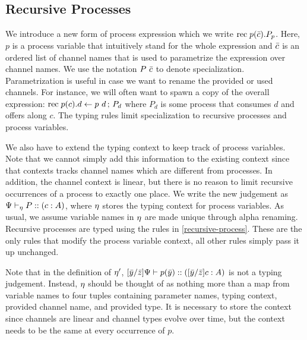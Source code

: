 \subsection{Recursive Processes}

We introduce a new form of process expression which we write $\mathrm{rec}\; {p}(\bar{c}) . {P}_p$. Here, $p$ is a process variable that intuitively stand for the whole expression and $\bar{c}$ is an ordered list of channel names that is used to parametrize the expression over channel names. We use the notation ${P}~{\bar{c}}$ to denote specialization. Parametrization is useful in case we want to rename the provided or used channels. For instance, we will often want to spawn a copy of the overall expression: $\mathrm{rec}\; {p}(c) . {d \leftarrow {p}~{d} \,;\, P_d}$ where $P_d$ is some process that consumes $d$ and offers along $c$. The typing rules limit specialization to recursive processes and process variables.

We also have to extend the typing context to keep track of process variables. Note that we cannot simply add this information to the existing context since that contexts tracks channel names which are different from processes. In addition, the channel context is linear, but there is no reason to limit recursive occurrences of a process to exactly one place. We write the new judgement as ${\Psi} \vdash_{\eta} P :: (c : A)$, where $\eta$ stores the typing context for process variables. As usual, we assume variable names in $\eta$ are made unique through alpha renaming. Recursive processes are typed using the rules in \cref{recursive-process}. These are the only rules that modify the process variable context, all other rules simply pass it up unchanged.


Note that in the definition of $\eta'$, $\lbrack{\bar{y}}/{\bar{z}}\rbrack{\Psi} \vdash {p}(\bar{y}) :: (\lbrack{\bar{y}}/{\bar{z}}\rbrack{c} : A)$ is not a typing judgement. Instead, $\eta$ should be thought of as nothing more than a map from variable names to four tuples containing parameter names, typing context, provided channel name, and provided type. It is necessary to store the context since channels are linear and channel types evolve over time, but the context needs to be the same at every occurrence of $p$.


